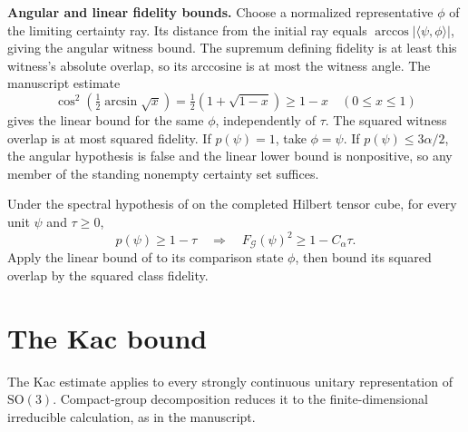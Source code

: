 \begin{theorem}
  \textbf{Angular and linear fidelity bounds.}
  Choose a normalized representative $\phi$ of the limiting certainty ray.
  Its distance from the initial ray equals
  $\arccos|\langle\psi,\phi\rangle|$, giving the angular witness bound.
  The supremum defining fidelity is at least this witness's absolute
  overlap, so its arccosine is at most the witness angle.
  The manuscript estimate
  \[
    \cos^2\!\left(\tfrac12\arcsin\sqrt{x}\right)
    =\tfrac12\left(1+\sqrt{1-x}\right)\ge1-x
    \quad(0\le x\le1)
  \]
  gives the linear bound for the same $\phi$, independently of $\tau$.
  The squared witness overlap is at most squared fidelity.
  If $p(\psi)=1$, take $\phi=\psi$. If $p(\psi)\le3\alpha/2$, the
  angular hypothesis is false and the linear lower bound is nonpositive,
  so any member of the standing nonempty certainty set suffices.
\end{theorem}

\begin{theorem}\label{thm:gradient-flow-intro}
  \leanok
  \par
  Under the spectral hypothesis of
   on the completed
  Hilbert tensor cube, for every unit $\psi$ and $\tau\ge0$,
  \[
    p(\psi)\ge1-\tau\quad\Longrightarrow\quad
    F_{\mathcal G}(\psi)^2\ge1-C_\alpha\tau .
  \]
  Apply the linear bound of  to its comparison
  state $\phi$, then bound its squared overlap by the squared class fidelity.
\end{theorem}

\chapter{The Kac bound}\label{sec:kac}

The Kac estimate applies to every strongly continuous unitary representation
of $\mathrm{SO}(3)$. Compact-group decomposition reduces it to the
finite-dimensional irreducible calculation, as in the manuscript.

